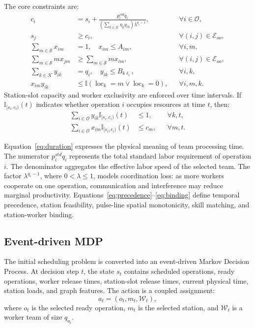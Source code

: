 The core constraints are:
\begin{align}
  c_i &= s_i + \frac{p_i^{std}q_i}{\left(\sum_{k\in\mathcal{K}}\eta_k y_{ik}\right)\lambda^{q_i-1}}, && \forall i\in\mathcal{O}, \label{eq:duration}\\
  s_j &\geq c_i, && \forall (i,j)\in\mathcal{E}_{oo}, \label{eq:precedence}\\
  \sum_{m\in\mathcal{S}}x_{im} &= 1,\quad x_{im}\leq A_{im}, && \forall i,m, \label{eq:station}\\
  \sum_{m\in\mathcal{S}}m x_{jm} &\geq \sum_{m\in\mathcal{S}}m x_{im}, && \forall (i,j)\in\mathcal{E}_{oo}, \label{eq:spatial}\\
  \sum_{k\in\mathcal{K}}y_{ik} &= q_i,\quad y_{ik}\leq B_{k\ell_i}, && \forall i,k, \label{eq:skill}\\
  x_{im}y_{ik} &\leq \mathbb{I}(\operatorname{loc}_k=m \lor \operatorname{loc}_k=0), && \forall i,m,k. \label{eq:binding}
\end{align}
Station-slot capacity and worker exclusivity are enforced over time intervals. If $\mathbb{I}_{[s_i,c_i)}(t)$ indicates whether operation $i$ occupies resources at time $t$, then:
\begin{align}
  \sum_{i\in\mathcal{O}} y_{ik}\mathbb{I}_{[s_i,c_i)}(t) &\leq 1, && \forall k,t,\\
  \sum_{i\in\mathcal{O}} x_{im}\mathbb{I}_{[s_i,c_i)}(t) &\leq c_m, && \forall m,t.
\end{align}

Equation~\eqref{eq:duration} expresses the physical meaning of team processing time. The numerator $p_i^{std}q_i$ represents the total standard labor requirement of operation $i$. The denominator aggregates the effective labor speed of the selected team. The factor $\lambda^{q_i-1}$, where $0<\lambda\leq1$, models coordination loss: as more workers cooperate on one operation, communication and interference may reduce marginal productivity. Equations~\eqref{eq:precedence}--\eqref{eq:binding} define temporal precedence, station feasibility, pulse-line spatial monotonicity, skill matching, and station-worker binding.

\subsection{Event-driven MDP}

The initial scheduling problem is converted into an event-driven Markov Decision Process. At decision step $t$, the state $s_t$ contains scheduled operations, ready operations, worker release times, station-slot release times, current physical time, station loads, and graph features. The action is a coupled assignment:
\begin{equation}
  a_t = (o_t,m_t,\mathcal{W}_t),
\end{equation}
where $o_t$ is the selected ready operation, $m_t$ is the selected station, and $\mathcal{W}_t$ is a worker team of size $q_{o_t}$.


